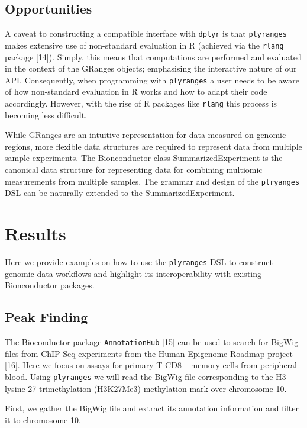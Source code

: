 \documentclass[10pt,letterpaper]{article}
\begin{document}
\subsection{Opportunities}\label{opportunities}

A caveat to constructing a compatible interface with \texttt{dplyr} is
that \texttt{plyranges} makes extensive use of non-standard evaluation
in R (achieved via the \texttt{rlang} package {[}14{]}). Simply, this
means that computations are performed and evaluated in the context of
the GRanges objects; emphasising the interactive nature of our API.
Consequently, when programming with \texttt{plyranges} a user needs to
be aware of how non-standard evaluation in R works and how to adapt
their code accordingly. However, with the rise of R packages like
\texttt{rlang} this process is becoming less difficult.

While GRanges are an intuitive representation for data measured on
genomic regions, more flexible data structures are required to represent
data from multiple sample experiments. The Bionconductor class
SummarizedExperiment is the canonical data structure for representing
data for combining multiomic measurements from multiple samples. The
grammar and design of the \texttt{plryanges} DSL can be naturally
extended to the SummarizedExperiment.

\section{Results}\label{results}

Here we provide examples on how to use the \texttt{plyranges} DSL to
construct genomic data workflows and highlight its interoperability with
existing Bionconductor packages.

\subsection{Peak Finding}\label{peak-finding}

The Bioconductor package \texttt{AnnotationHub} {[}15{]} can be used to
search for BigWig files from ChIP-Seq experiments from the Human
Epigenome Roadmap project {[}16{]}. Here we focus on assays for primary
T CD8+ memory cells from peripheral blood. Using \texttt{plyranges} we
will read the BigWig file corresponding to the H3 lysine 27
trimethylation (H3K27Me3) methylation mark over chromosome 10.

First, we gather the BigWig file and extract its annotation information
and filter it to chromosome 10.
\end{document}
